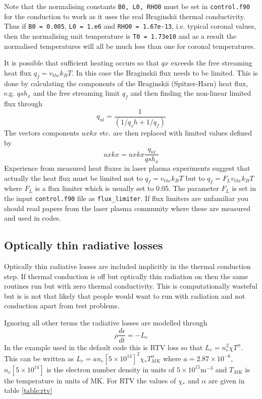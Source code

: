 \documentclass[11pt]{article}
\begin{document}
Note that the normalising constants \texttt{B0, L0, RHO0} must be set in \texttt{control.f90} for the conduction to work as it uses the real Braginskii thermal conductivity. Thus if \texttt{B0 = 0.005}, \texttt{L0 = 1.e6} and \texttt{RHO0 = 1.67e-13}, i.e. typical coronal values, then the normalising unit temperature is \texttt{T0 = 1.73e10} and as a result the normalised temperatures will all be much less than one for coronal temperatures.

It is possible that sufficient heating occurs so that $qx$ exceeds the free streaming heat flux $q_f=v_{the} k_B T$. In this case the Braginskii flux needs to be limited. This is done by calculating the components of the Braginskii (Spitzer-Harn) heat flux, e.g. $qsh_x$ and the free streaming limit $q_f$ and then finding the non-linear limited flux through
\[
q_{nl} = \frac{1}{(1/q_sh + 1/q_f)}
\]
The vectors components $uxkx$ etc. are then replaced with limited values defined by
\[
uxkx=uxkx\frac{q_{nl}}{qsh_x}
\]
Experience from measured heat fluxes in laser plasma experiments suggest that actually the heat flux must be limited not to $q_f=v_{the} k_B T$ but to $q_f=F_L v_{the} k_B T$  where $F_L$ is a flux limiter which is usually set to 0.05. The parameter $F_L$ is set in the input \texttt{control.f90} file as \texttt{flux\_limiter}. If flux limiters are unfamiliar you should read papers from the laser plasma community where these are measured and used in codes.

\subsection*{Optically thin radiative losses}
Optically thin radiative losses are included implicitly in the thermal conduction step. If thermal conduction is off but optically thin radiation on then the same routines run but with zero thermal conductivity. This is computationally wasteful but is is not that likely that people would want to run with radiation and not conduction apart from test problems.

Ignoring all other terms the radiative losses are modelled through
\[
\rho\frac{d\epsilon}{dt}=-L_r
\]
In the example used in the default code this is RTV loss so that $L_r=n_e^2 \chi T^{\alpha}$. This can be written as
$L_r=a n_e[5\times10^{14}]^2 \chi_* T_{MK}^{\alpha}$ where $a=2.87\times10^{-6}$, $n_e[5\times10^{14}]$ is the electron number density in units of $5\times10^{15} \mathrm{m}^{-3}$ and $T_{MK}$ is the temperature in units of MK. For RTV the values of $\chi_*$ and $\alpha$ are given in table \ref{table:rtv}
\end{document}
